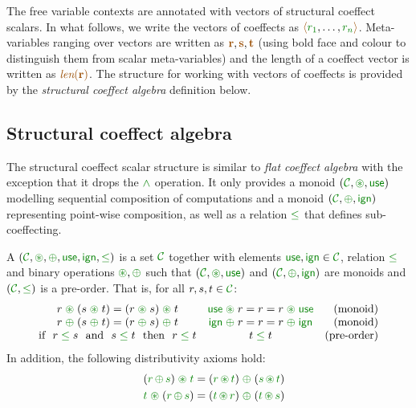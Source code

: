 The free variable contexts are annotated with vectors of structural coeffect scalars. In what follows,
we write the vectors of coeffects as $\alift{\cclrd{r_1}, \ldots, \cclrd{r_n}}$. Meta-variables ranging 
over vectors are written as $\aclrd{\textbf{r}}, \aclrd{\textbf{s}}, \aclrd{\textbf{t}}$ (using bold face 
and colour to distinguish them from scalar meta-variables) and the length of a coeffect vector
is written as $\slift{\aclrd{\textbf{r}}}$. The structure for working with vectors
of coeffects is provided by the \emph{structural coeffect algebra} definition below. 


\subsection{Structural coeffect algebra}

The structural coeffect scalar structure is similar to \emph{flat coeffect algebra} with the 
exception that it drops the $\czip$ operation. It only provides a monoid $(\C, \cseq, \cunit)$
modelling sequential composition of computations and a monoid $(\C, \cpar, \czero)$ representing
point-wise composition, as well as a relation $\cleq$ that defines sub-coeffecting.

\begin{definition}
A \emph{} $(\C, \cseq, \cpar, \cunit, \czero, \cleq)$ is a set 
$\C$ together with elements $\cunit, \czero \in \C$, relation $\cleq$ and binary operations 
$\cseq, \cpar$ such that $(\C, \cseq, \cunit)$ and $(\C, \cpar, \czero)$ are monoids and
$(\C, \cleq)$ is a pre-order. That is, for all $r,s,t\in \C$:
%
\begin{equation*}
\begin{array}{ccr}
r \;\cseq\; (s \;\cseq\; t) = (r \;\cseq\; s) \;\cseq\; t  &
\cunit \;\cseq\; r = r = r \;\cseq\; \cunit &
\textnormal{(monoid)}   
\\
r \;\cpar\; (s \;\cpar\; t) = (r \;\cpar\; s) \;\cpar\; t &
\czero \;\cpar\; r = r = r \;\cpar\; \czero &
\textnormal{(monoid)}   
\\
\textnormal{if}~~r\; \cleq\; s ~~\textnormal{and}~~s\; \cleq\; t~~\textnormal{then}~~r\; \cleq\; t&
t\; \cleq\; t &
\textnormal{(pre-order)}   
\end{array}
\end{equation*}
%
In addition, the following distributivity axioms hold:
\begin{align*}
\quad (\cclrd{r}\, \cpar\, \cclrd{s}) \;\cseq\; \cclrd{t} & = (\cclrd{r} \,\cseq\, \cclrd{t}) \;\cpar\; (\cclrd{s}\, \cseq\, \cclrd{t}) \\
\quad \cclrd{t} \;\cseq\; (\cclrd{r}\, \cpar\, \cclrd{s}) & = (\cclrd{t} \,\cseq\, \cclrd{r}) \;\cpar\; (\cclrd{t}\, \cseq\, \cclrd{s})
\end{align*}
\end{definition}

